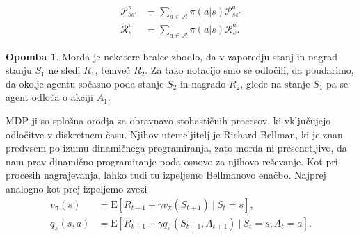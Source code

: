 \documentclass[12pt,a4paper]{amsart}
\theoremstyle{definition} %
\newtheorem{opomba}[definicija]{Opomba}
\theoremstyle{plain} %
\begin{document}
\begin{align*}
    \mathcal{P}^\pi_{ss'} &= \sum_{a \in \mathcal{A}} \pi(a|s) \mathcal{P}_{ss'}^a \\
    \mathcal{R}^\pi_{s} &= \sum_{a \in \mathcal{A}} \pi(a|s) \mathcal{R}_{s}^a. 
    \end{align*}

\begin{opomba}
    Morda je nekatere bralce zbodlo, da v zaporedju stanj in nagrad stanju $S_1$ ne sledi $R_1$, temveč 
    $R_2$. Za tako notacijo smo se odločili, da poudarimo, da okolje agentu sočasno poda stanje $S_2$
    in nagrado $R_2$, glede na stanje $S_1$ pa se agent odloča o akciji $A_1$.
\end{opomba}

MDP-ji so splošna orodja za obravnavo stohastičnih procesov, ki vključujejo odločitve v diskretnem 
času. Njihov utemeljitelj je Richard Bellman, ki je znan predvsem po izumu dinamičnega 
programiranja, zato morda ni presenetljivo, da nam prav dinamično programiranje poda osnovo za 
njihovo reševanje.
Kot pri procesih nagrajevanja, lahko tudi tu izpeljemo Bellmanovo enačbo. Najprej analogno kot prej izpeljemo 
zvezi
\begin{align*}
    v_\pi(s) &= \mathrm{E} [R_{t+1} + \gamma v_\pi(S_{t+1})~|~S_t = s], \\
    q_\pi(s, a) &= \mathrm{E} [R_{t+1} + \gamma q_\pi(S_{t+1}, A_{t+1})~|~S_t = s, A_t = a].
\end{align*}
\end{document}
